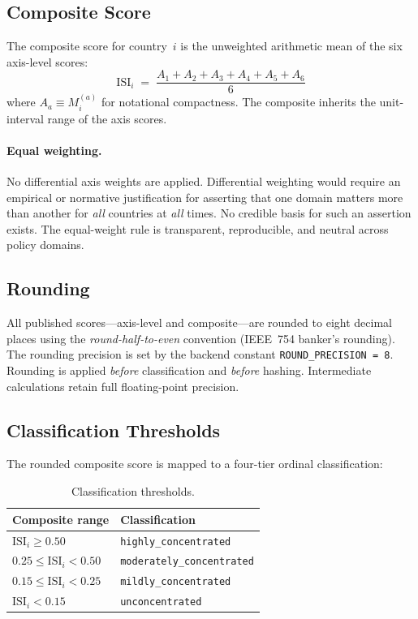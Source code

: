 \subsection{Composite Score}\label{sec:math:composite}

The composite \ISI score for country~\(i\) is the unweighted arithmetic mean
of the six axis-level scores:
%
\begin{equation}\label{eq:composite}
  \mathrm{ISI}_i
  \;=\;
  \frac{A_1 + A_2 + A_3 + A_4 + A_5 + A_6}{6}
\end{equation}
%
where \(A_a \equiv M_i^{(a)}\) for notational compactness.  The composite
inherits the unit-interval range of the axis scores.

\paragraph{Equal weighting.}
No differential axis weights are applied.  Differential weighting would
require an empirical or normative justification for asserting that one domain
matters more than another for \emph{all} countries at \emph{all} times.  No
credible basis for such an assertion exists.  The equal-weight rule is
transparent, reproducible, and neutral across policy domains.

\subsection{Rounding}\label{sec:math:rounding}

All published scores---axis-level and composite---are rounded to eight
decimal places using the \emph{round-half-to-even} convention (IEEE~754
banker's rounding).  The rounding precision is set by the backend constant
\texttt{ROUND\_PRECISION\,=\,8}.  Rounding is applied \emph{before}
classification and \emph{before} hashing.  Intermediate calculations retain
full floating-point precision.

\subsection{Classification Thresholds}\label{sec:math:thresholds}

The rounded composite score is mapped to a four-tier ordinal classification:

\begin{table}[htbp]
  \centering\small
  \caption{Classification thresholds.}\label{tab:thresholds}
  \begin{tabular}{@{}l l@{}}
    \toprule
    \textbf{Composite range}     & \textbf{Classification} \\
    \midrule
    \(\mathrm{ISI}_i \geq 0.50\) & \texttt{highly\_concentrated}     \\
    \(0.25 \leq \mathrm{ISI}_i < 0.50\) & \texttt{moderately\_concentrated} \\
    \(0.15 \leq \mathrm{ISI}_i < 0.25\) & \texttt{mildly\_concentrated}     \\
    \(\mathrm{ISI}_i < 0.15\)    & \texttt{unconcentrated}          \\
    \bottomrule
  \end{tabular}
\end{table}

